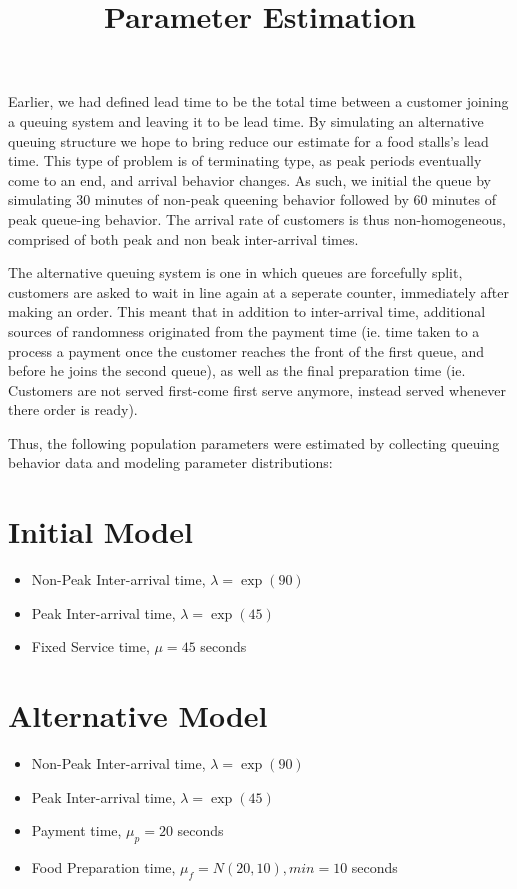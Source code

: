 \documentclass{article}
\begin{document}
\pagecolor{ultramarine}
\title{Parameter Estimation}
\author{}
\date{}
\maketitle
Earlier, we had defined lead time to be the total time between a customer joining a queuing system and leaving it to be lead time. By simulating an alternative queuing structure we hope to bring reduce our estimate for a food stalls's lead time. This type of problem is of terminating type, as peak periods eventually come to an end, and arrival behavior changes. As such, we initial the queue by simulating 30 minutes of non-peak queening behavior followed by 60 minutes of peak queue-ing behavior. The arrival rate of customers is thus non-homogeneous, comprised of both peak and non beak inter-arrival times.

The alternative queuing system is one in which queues are forcefully split, customers are asked to wait in line again at a seperate counter, immediately after making an order. This meant that in addition to inter-arrival time, additional sources of randomness originated from the payment time (ie. time taken to a process a payment once the customer reaches the front of the first queue, and before he joins the second queue), as well as the final preparation time (ie. Customers are not served first-come first serve anymore, instead served whenever there order is ready).

Thus, the following population parameters were estimated by collecting queuing
behavior data and modeling parameter distributions:
\section*{Initial Model}
\begin{itemize}
    \item Non-Peak Inter-arrival time, $\lambda = \exp(90)$
    \item Peak Inter-arrival time, $\lambda = \exp(45)$
    \item Fixed Service time, $\mu = 45$ seconds
\end{itemize}
\section*{Alternative Model}
\begin{itemize}
    \item Non-Peak Inter-arrival time, $\lambda = \exp(90)$
    \item Peak Inter-arrival time, $\lambda = \exp(45)$
    \item Payment time, $\mu_p = 20$ seconds
    \item Food Preparation time, $\mu_f = N(20,10), min=10$ seconds
\end{itemize}
\end{document}
